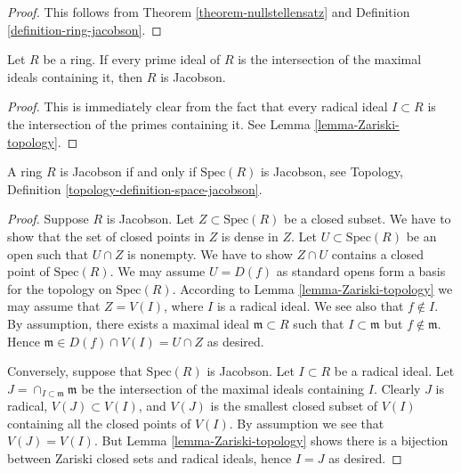 \begin{proof}
This follows from Theorem \ref{theorem-nullstellensatz}
and Definition \ref{definition-ring-jacobson}.
\end{proof}

\begin{lemma}
\label{lemma-jacobson-prime}
Let $R$ be a ring. If every prime ideal of $R$ is the
intersection of the maximal ideals containing it,
then $R$ is Jacobson.
\end{lemma}

\begin{proof}
This is immediately clear from the fact that
every radical ideal $I \subset R$ is the
intersection of the primes containing it.
See Lemma \ref{lemma-Zariski-topology}.
\end{proof}

\begin{lemma}
\label{lemma-jacobson}
A ring $R$ is Jacobson if and only if $\text{Spec}(R)$
is Jacobson, see Topology,
Definition \ref{topology-definition-space-jacobson}.
\end{lemma}

\begin{proof}
Suppose $R$ is Jacobson. Let $Z \subset \text{Spec}(R)$
be a closed subset. We have to show that the set of closed
points in $Z$ is dense in $Z$. Let $U \subset \text{Spec}(R)$
be an open such that $U \cap Z$ is nonempty.
We have to show $Z \cap U$ contains a closed point
of $\text{Spec}(R)$. We may
assume $U = D(f)$ as standard opens form a basis for the
topology on $\text{Spec}(R)$. According to
Lemma \ref{lemma-Zariski-topology} we may assume that
$Z = V(I)$, where $I$ is a radical ideal. We see also
that $f \not \in I$. By assumption, there exists a
maximal ideal $\mathfrak m \subset R$ such that
$I \subset \mathfrak m$ but $f \not\in \mathfrak m$.
Hence $\mathfrak m \in D(f) \cap V(I) = U \cap Z$ as desired.

\medskip\noindent
Conversely, suppose that $\text{Spec}(R)$ is Jacobson.
Let $I \subset R$ be a radical ideal. Let
$J = \cap_{I \subset \mathfrak m} \mathfrak m$
be the intersection of the maximal ideals containing $I$.
Clearly $J$ is radical, $V(J) \subset V(I)$, and
$V(J)$ is the smallest closed subset of $V(I)$ containing
all the closed points of $V(I)$. By assumption we see that
$V(J) = V(I)$. But Lemma \ref{lemma-Zariski-topology}
shows there is a bijection between Zariski closed
sets and radical ideals, hence $I = J$ as desired.
\end{proof}

